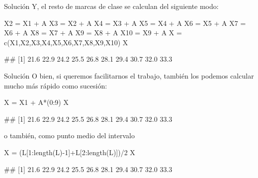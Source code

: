 \documentclass[
  ignorenonframetext,
  aspectratio=169]{beamer}
\newenvironment{Shaded}{\begin{snugshade}}{\end{snugshade}}
\newcommand{\DecValTok}[1]{\textcolor[rgb]{0.00,0.00,0.81}{#1}}
\newcommand{\FunctionTok}[1]{\textcolor[rgb]{0.00,0.00,0.00}{#1}}
\newcommand{\NormalTok}[1]{#1}
\newcommand{\OtherTok}[1]{\textcolor[rgb]{0.56,0.35,0.01}{#1}}
\newcommand{\SpecialCharTok}[1]{\textcolor[rgb]{0.00,0.00,0.00}{#1}}
\let\oldverbatim\verbatim
\let\endoldverbatim\endverbatim
\renewenvironment{verbatim}{\tiny\oldverbatim}{\endoldverbatim}
\begin{document}
\begin{frame}[fragile]{Solución}
\protect\hypertarget{soluciuxf3n-9}{}
Y, el resto de marcas de clase se calculan del siguiente modo:

\begin{Shaded}
\begin{Highlighting}[]
\NormalTok{X2 }\OtherTok{=}\NormalTok{ X1 }\SpecialCharTok{+}\NormalTok{ A}
\NormalTok{X3 }\OtherTok{=}\NormalTok{ X2 }\SpecialCharTok{+}\NormalTok{ A}
\NormalTok{X4 }\OtherTok{=}\NormalTok{ X3 }\SpecialCharTok{+}\NormalTok{ A}
\NormalTok{X5 }\OtherTok{=}\NormalTok{ X4 }\SpecialCharTok{+}\NormalTok{ A}
\NormalTok{X6 }\OtherTok{=}\NormalTok{ X5 }\SpecialCharTok{+}\NormalTok{ A}
\NormalTok{X7 }\OtherTok{=}\NormalTok{ X6 }\SpecialCharTok{+}\NormalTok{ A}
\NormalTok{X8 }\OtherTok{=}\NormalTok{ X7 }\SpecialCharTok{+}\NormalTok{ A}
\NormalTok{X9 }\OtherTok{=}\NormalTok{ X8 }\SpecialCharTok{+}\NormalTok{ A}
\NormalTok{X10 }\OtherTok{=}\NormalTok{ X9 }\SpecialCharTok{+}\NormalTok{ A}
\NormalTok{X }\OtherTok{=} \FunctionTok{c}\NormalTok{(X1,X2,X3,X4,X5,X6,X7,X8,X9,X10)}
\NormalTok{X}
\end{Highlighting}
\end{Shaded}

\begin{verbatim}
##  [1] 21.6 22.9 24.2 25.5 26.8 28.1 29.4 30.7 32.0 33.3
\end{verbatim}
\end{frame}

\begin{frame}[fragile]{Solución}
\protect\hypertarget{soluciuxf3n-10}{}
O bien, si queremos facilitarnos el trabajo, también los podemos
calcular mucho más rápido como sucesión:

\begin{Shaded}
\begin{Highlighting}[]
\NormalTok{X }\OtherTok{=}\NormalTok{ X1 }\SpecialCharTok{+}\NormalTok{ A}\SpecialCharTok{*}\NormalTok{(}\DecValTok{0}\SpecialCharTok{:}\DecValTok{9}\NormalTok{)}
\NormalTok{X}
\end{Highlighting}
\end{Shaded}

\begin{verbatim}
##  [1] 21.6 22.9 24.2 25.5 26.8 28.1 29.4 30.7 32.0 33.3
\end{verbatim}

o también, como punto medio del intervalo

\begin{Shaded}
\begin{Highlighting}[]
\NormalTok{X }\OtherTok{=}\NormalTok{ (L[}\DecValTok{1}\SpecialCharTok{:}\FunctionTok{length}\NormalTok{(L)}\SpecialCharTok{{-}}\DecValTok{1}\NormalTok{]}\SpecialCharTok{+}\NormalTok{L[}\DecValTok{2}\SpecialCharTok{:}\FunctionTok{length}\NormalTok{(L)])}\SpecialCharTok{/}\DecValTok{2}
\NormalTok{X}
\end{Highlighting}
\end{Shaded}

\begin{verbatim}
##  [1] 21.6 22.9 24.2 25.5 26.8 28.1 29.4 30.7 32.0 33.3
\end{verbatim}
\end{frame}
\end{document}
